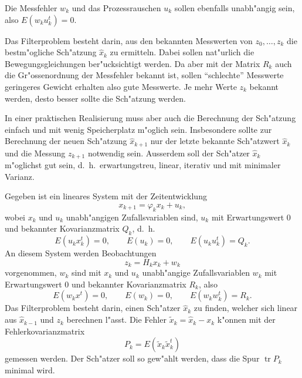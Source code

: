 Die Messfehler $w_k$ und das Prozessrauschen $u_k$ sollen ebenfalls unabh"angig
sein, also $E(w_ku_k^t)=0$.

Das Filterproblem besteht darin, aus den bekannten Messwerten von $z_0,\dots,z_k$
die bestm"ogliche Sch"atzung $\hat x_k$ zu ermitteln. Dabei sollen
nat"urlich die Bewegungsgleichungen ber"ucksichtigt werden. Da aber
mit der Matrix $R_k$ auch die Gr"ossenordnung der Messfehler bekannt ist,
sollen ``schlechte'' Messwerte geringeres Gewicht erhalten also gute
Messwerte. Je mehr Werte $z_k$ bekannt werden, desto besser sollte die
Sch"atzung werden.

In einer praktischen Realisierung muss aber auch die Berechnung der Sch"atzung
einfach und mit wenig Speicherplatz m"oglich sein. Insbesondere sollte zur
Berechnung der neuen Sch"atzung $\hat x_{k+1}$ nur der letzte bekannte Sch"atzwert
$\hat x_k$ und die Messung $z_{k+1}$ notwendig sein. Ausserdem soll der Sch"atzer
$\hat x_k$ m"oglichst gut sein, d.~h.~erwartungstreu, linear, iterativ und
mit minimaler Varianz.

\begin{definition}Gegeben ist ein lineares System mit der Zeitentwicklung
\[
x_{k+1}=\varphi_kx_k+u_k,
\]
wobei $x_k$ und $u_k$ unabh"angigen Zufallsvariablen sind,
$u_k$ mit Erwartungswert $0$ und bekannter Kovarianzmatrix $Q_k$, d.~h.
\[
E(u_kx_k^t)=0,\qquad E(u_k)=0,\qquad E(u_ku_k^t)=Q_k.
\]
An diesem System werden Beobachtungen
\[
z_k=H_kx_k+w_k
\]
vorgenommen, $w_k$ sind mit $x_k$ und $u_k$ unabh"angige Zufallsvariablen
$w_k$ mit Erwartungswert $0$ und bekannter Kovarianzmatrix $R_k$, also
\[
E(w_kx^t)=0,\qquad E(w_k)=0,\qquad E(w_kw_k^t)=R_k.
\]
Das Filterproblem besteht darin, einen Sch"atzer $\hat x_k$ zu
finden, welcher sich linear aus $\hat x_{k-1}$ und $z_k$ berechnen l"asst.
Die Fehler $\tilde x_k=\hat x_k-x_k$ k"onnen mit der Fehlerkovarianzmatrix
\[
P_k=E(\tilde x_k\tilde x_k^t)
\]
gemessen werden. Der Sch"atzer soll so gew"ahlt werden, dass die Spur
$\operatorname{tr}P_k$ minimal wird.
\end{definition}

